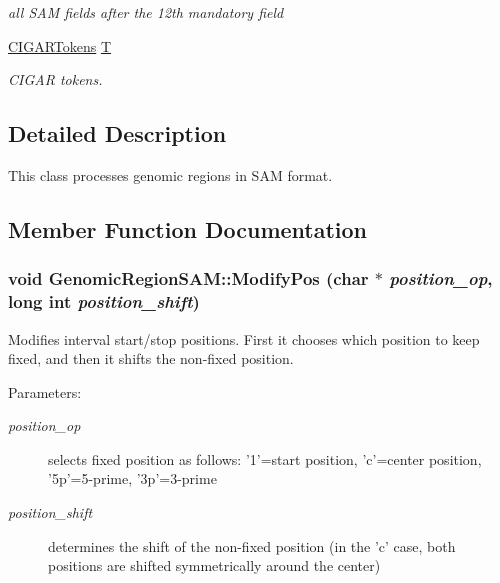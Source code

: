 \begin{CompactItemize}
\begin{CompactList}\small\item\em all SAM fields after the 12th mandatory field \item\end{CompactList}\item 
\hypertarget{classGenomicRegionSAM_47afdde68b89cf4ea199bc91d4954a92}{
\hyperlink{classGenomicRegionSAM_adf8580c5362304ab4866fa76a59df96}{CIGARTokens} \hyperlink{classGenomicRegionSAM_47afdde68b89cf4ea199bc91d4954a92}{T}}
\label{classGenomicRegionSAM_47afdde68b89cf4ea199bc91d4954a92}

\begin{CompactList}\small\item\em CIGAR tokens. \item\end{CompactList}\end{CompactItemize}


\subsection{Detailed Description}
This class processes genomic regions in SAM format. 

\subsection{Member Function Documentation}
\hypertarget{classGenomicRegionSAM_353207352073db00dee0a9b620dca197}{
\subsubsection[ModifyPos]{\setlength{\rightskip}{0pt plus 5cm}void GenomicRegionSAM::ModifyPos (char $\ast$ {\em position\_\-op}, \/  long int {\em position\_\-shift})}}
\label{classGenomicRegionSAM_353207352073db00dee0a9b620dca197}


Modifies interval start/stop positions. First it chooses which position to keep fixed, and then it shifts the non-fixed position. 

\begin{Desc}
\item[Parameters:]
\begin{description}
\item[{\em position\_\-op}]selects fixed position as follows: '1'=start position, 'c'=center position, '5p'=5-prime, '3p'=3-prime \item[{\em position\_\-shift}]determines the shift of the non-fixed position (in the 'c' case, both positions are shifted symmetrically around the center) \end{description}
\end{Desc}


